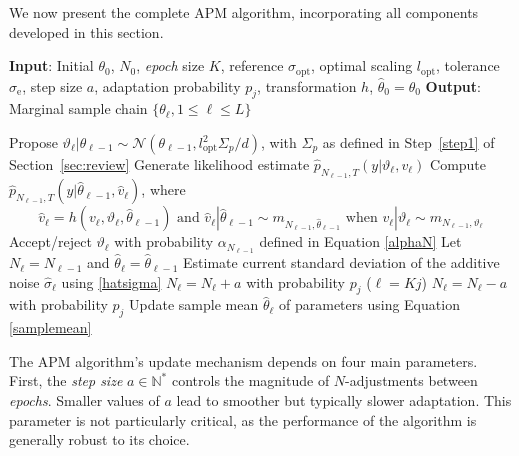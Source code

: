 \documentclass[pdflatex,sn-mathphys-num]{sn-jnl}
\newcommand{\Norm}{\mathcal{N}}
\newcommand{\natsstar}{\mathbb{N}^*}
\newcommand{\textopt}{\text{opt}}
\renewcommand{\leq}{\leqslant}
\theoremstyle{thmstyleone}
\theoremstyle{thmstyletwo}
\theoremstyle{thmstylethree}
\begin{document}
We now present the complete APM algorithm, incorporating all components developed in this section. 
\begin{algorithm}[H]
{\small
\caption{Adaptive Pseudo-Marginal Algorithm}\label{algo:apm}
\begin{algorithmic}[1]
\State \textbf{Input}: Initial $\theta_0$, $N_0$, \textit{epoch} size $K$, reference $\sigma_\textopt$, optimal scaling $l_{\text{opt}}$, tolerance $\sigma_\text{e}$, step size $a$, adaptation probability $p_j$, transformation $h$, $\hat \theta_0=\theta_0$
\State \textbf{Output}: Marginal sample chain $\{\theta_\ell, 1 \leq \ell \leq L\}$

    \State Propose $\vartheta_\ell|\theta_{\ell-1} \sim \Norm(\theta_{\ell-1}, {l_{\text{opt}}^2 \Sigma_p}/{d})$, with $\Sigma_p$ as defined in Step~\ref{step1} of Section~\ref{sec:review}
    \State Generate likelihood estimate $\widehat{p}_{N_{\ell-1},T}(y|\vartheta_\ell,v_\ell)$
    \State Compute $\widehat{p}_{N_{\ell-1},T}(y|\hat{\theta}_{\ell-1},\hat{v}_\ell)$, where $$\hat v_\ell = h(v_\ell, \vartheta_\ell, \hat\theta_{\ell-1}) \text{ and }
    \hat v_\ell| \hat\theta_{\ell-1}\sim m_{N_{\ell-1},\hat\theta_{\ell-1}}
   \text{ when } v_\ell|\vartheta_\ell \sim m_{N_{\ell-1},\vartheta_\ell}$$
    \State Accept/reject $\vartheta_\ell$ with  probability $\alpha_{N_{\ell-1}}$ defined in Equation \eqref{alphaN}
    \State Let $N_{\ell}=N_{\ell-1}$ and $\hat\theta_{\ell}=\hat\theta_{\ell-1}$
    \If{$\ell \in K\natsstar$}
        \State Estimate current standard deviation of the additive noise $\widehat{\sigma}_\ell$ using \eqref{hatsigma}
        \If{$\widehat{\sigma}_\ell > \sigma_\textopt + \sigma_\text{e}$} \label{adaptstep}
            \State $N_\ell=N_{\ell}+a$ with probability $p_j$ ($\ell=Kj$)
        \ElsIf{$\widehat{\sigma}_\ell < \sigma_\textopt - \sigma_\text{e}$ and $N_{\ell-1} > a$}
            \State $N_\ell=N_{\ell}-a$  with probability $p_j$
        \EndIf
        \State Update sample mean $\hat{\theta}_\ell$ of parameters using Equation \eqref{samplemean}
    \EndIf
\EndFor
\end{algorithmic}}
\end{algorithm}

The APM algorithm's update mechanism depends on four main parameters. 
First, the \textit{step size} $a \in \mathbb{N}^*$ controls the magnitude of $N$-adjustments between \textit{epochs}. 
Smaller values of $a$ lead to smoother but typically slower adaptation. 
This parameter is not particularly critical, as the performance of the algorithm is generally robust to its choice. 
\end{document}
